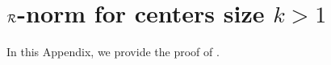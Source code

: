 





\section{${\mathcal{R}}$-norm for centers size $k > 1$}\label{app: explicit}
In this Appendix, we provide the proof of .

